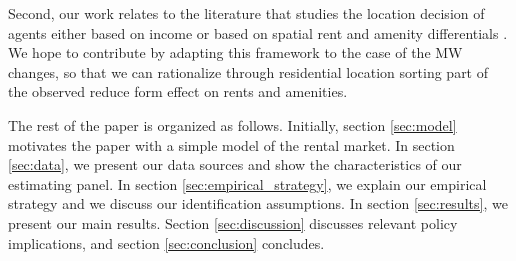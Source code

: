 Second, our work relates to the literature that studies the location decision of agents either based 
on income \parencite{roback1982wages, kennan2011effect, desmet2013urban, perez2018city} or based on 
spatial rent and amenity differentials \parencite{diamond2016determinants, almagro2019location, 
couture2019income, bayer2004equilibrium}. We hope to contribute by adapting this framework to the 
case of the MW changes, so that we can rationalize through residential location sorting part of 
the observed reduce form effect on rents and amenities.

The rest of the paper is organized as follows. Initially, section \ref{sec:model} motivates the paper
with a simple model of the rental market. In section \ref{sec:data}, we present our data sources and 
show the characteristics of our estimating panel. In section \ref{sec:empirical_strategy}, we explain 
our empirical strategy and we discuss our identification assumptions. In section \ref{sec:results}, we 
present our main results. Section \ref{sec:discussion} discusses relevant policy implications, and 
section \ref{sec:conclusion} concludes.
